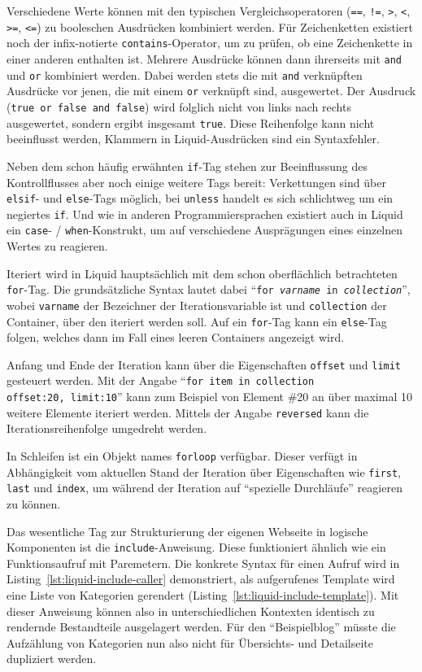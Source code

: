 Verschiedene Werte können mit den typischen Vergleichsoperatoren (\texttt{==}, \texttt{!=}, \texttt{>}, \texttt{<}, \texttt{>=}, \texttt{<=}) zu booleschen Ausdrücken kombiniert werden. Für Zeichenketten existiert noch der infix-notierte \texttt{contains}-Operator, um zu prüfen, ob eine Zeichenkette in einer anderen enthalten ist. Mehrere Ausdrücke können dann ihrerseits  mit \texttt{and} und \texttt{or} kombiniert werden. Dabei werden stets die mit \texttt{and} verknüpften Ausdrücke vor jenen, die mit einem \texttt{or} verknüpft sind, ausgewertet. Der Ausdruck (\texttt{true or false and false}) wird folglich nicht von links nach rechts ausgewertet, sondern ergibt insgesamt \texttt{true}. Diese Reihenfolge kann nicht beeinflusst werden, Klammern in Liquid-Ausdrücken sind ein Syntaxfehler.

Neben dem schon häufig erwähnten \texttt{if}-Tag stehen zur Beeinflussung des Kontrollflusses aber noch einige weitere Tags bereit: Verkettungen sind über \texttt{elsif}- und \texttt{else}-Tags möglich, bei \texttt{unless} handelt es sich schlichtweg um ein negiertes \texttt{if}. Und wie in anderen Programmiersprachen existiert auch in Liquid ein \texttt{case}- / \texttt{when}-Konstrukt, um auf verschiedene Ausprägungen eines einzelnen Wertes zu reagieren.

Iteriert wird in Liquid hauptsächlich mit dem schon oberflächlich betrachteten \texttt{for}-Tag. Die grundsätzliche Syntax lautet dabei "`\texttt{for~\textit{varname}~in~\textit{collection}}"', wobei \texttt{varname} der Bezeichner der Iterationsvariable ist und \texttt{collection} der Container, über den iteriert werden soll. Auf ein \texttt{for}-Tag kann ein \texttt{else}-Tag folgen, welches dann im Fall eines leeren Containers angezeigt wird.

Anfang und Ende der Iteration kann über die Eigenschaften \texttt{offset} und \texttt{limit} gesteuert werden. Mit der Angabe "`\texttt{for item in collection offset:20,~limit:10}"' kann zum Beispiel von Element \#20 an über maximal 10 weitere Elemente iteriert werden. Mittels der Angabe \texttt{reversed} kann die Iterationsreihenfolge umgedreht werden.

In Schleifen ist ein Objekt names \texttt{forloop} verfügbar. Dieser verfügt in Abhängigkeit vom aktuellen Stand der Iteration über Eigenschaften wie \texttt{first}, \texttt{last} und \texttt{index}, um während der Iteration auf "`spezielle Durchläufe"' reagieren zu können.

Das wesentliche Tag zur Strukturierung der eigenen Webseite in logische Komponenten ist die \texttt{include}-Anweisung. Diese funktioniert ähnlich wie ein Funktionsaufruf mit Paremetern. Die konkrete Syntax für einen Aufruf wird in Listing~\ref{lst:liquid-include-caller} demonstriert, als aufgerufenes Template wird eine Liste von Kategorien gerendert (Listing~\ref{lst:liquid-include-template}). Mit dieser Anweisung können also in unterschiedlichen Kontexten identisch zu rendernde Bestandteile ausgelagert werden. Für den "`Beispielblog"' müsste die Aufzählung von Kategorien nun also nicht für Übersichts- und Detailseite dupliziert werden.

